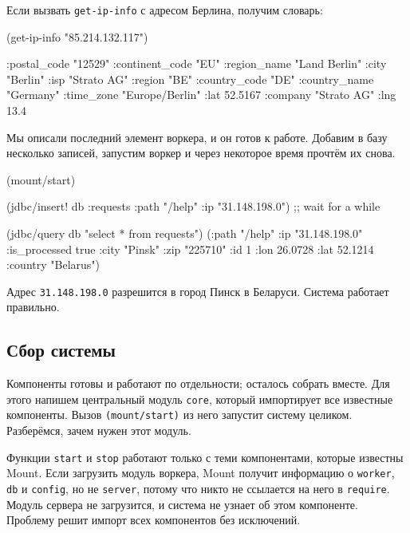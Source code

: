 \noindent
Если вызвать \verb|get-ip-info| с адресом Берлина, получим словарь:


\begin{english}
  \begin{clojure}
(get-ip-info "85.214.132.117")

{:postal_code "12529"
 :continent_code "EU"
 :region_name "Land Berlin"
 :city "Berlin"
 :isp "Strato AG"
 :region "BE"
 :country_code "DE"
 :country_name "Germany"
 :time_zone "Europe/Berlin"
 :lat 52.5167
 :company "Strato AG"
 :lng 13.4}
  \end{clojure}
\end{english}

Мы описали последний элемент воркера, и он готов к работе. Добавим в базу
несколько записей, запустим воркер и через некоторое время прочтём их снова.

\begin{english}
  \begin{clojure}
(mount/start)

(jdbc/insert! db :requests {:path "/help" :ip "31.148.198.0"})
;; wait for a while

(jdbc/query db "select * from requests")
({:path "/help" :ip "31.148.198.0" :is_processed true
  :city "Pinsk" :zip "225710" :id 1
  :lon 26.0728 :lat 52.1214 :country "Belarus"})
  \end{clojure}
\end{english}

Адрес \verb|31.148.198.0| разрешится в город Пинск в Беларуси. Система работает
правильно.

\subsection{Сбор системы}


Компоненты готовы и работают по отдельности; осталось собрать вместе. Для этого
напишем центральный модуль \verb|core|, который импортирует все известные
компоненты. Вызов \verb|(mount/start)| из него запустит систему
целиком. Разберёмся, зачем нужен этот модуль.

Функции \verb|start| и \verb|stop| работают только с теми компонентами, которые
известны Mount. Если загрузить модуль воркера, Mount получит информацию о
\verb|worker|, \verb|db| и \verb|config|, но не \verb|server|, потому что никто
не ссылается на него в \verb|require|. Модуль сервера не загрузится, и система
не узнает об этом компоненте. Проблему решит импорт всех компонентов без
исключений.

